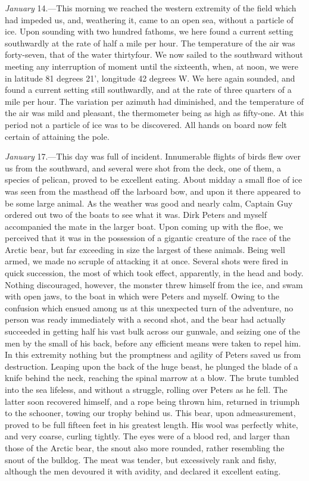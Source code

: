 \emph{January} 14.---This morning we reached the western extremity of the
field which had impeded us, and, weathering it, came to an open sea, without a
particle of ice. Upon sounding with two hundred fathoms, we here found a current
setting southwardly at the rate of half a mile per hour. The temperature of the
air was forty-seven, that of the water thirtyfour. We now sailed to the
southward without meeting any interruption of moment until the sixteenth, when,
at noon, we were in latitude 81 degrees 21', longitude 42 degrees W. We here
again sounded, and found a current setting still southwardly, and at the rate of
three quarters of a mile per hour. The variation per azimuth had diminished, and
the temperature of the air was mild and pleasant, the thermometer being as high
as fifty-one. At this period not a particle of ice was to be discovered. All
hands on board now felt certain of attaining the pole. 

\emph{January} 17.---This day was full of incident. Innumerable flights of
birds flew over us from the southward, and several were shot from the deck, one
of them, a species of pelican, proved to be excellent eating. About midday a
small floe of ice was seen from the masthead off the larboard bow, and upon it
there appeared to be some large animal. As the weather was good and nearly calm,
Captain Guy ordered out two of the boats to see what it was. Dirk Peters and
myself accompanied the mate in the larger boat. Upon coming up with the floe, we
perceived that it was in the possession of a gigantic creature of the race of
the Arctic bear, but far exceeding in size the largest of these animals. Being
well armed, we made no scruple of attacking it at once. Several shots were fired
in quick succession, the most of which took effect, apparently, in the head and
body. Nothing discouraged, however, the monster threw himself from the ice, and
swam with open jaws, to the boat in which were Peters and myself. Owing to the
confusion which ensued among us at this unexpected turn of the adventure, no
person was ready immediately with a second shot, and the bear had actually
succeeded in getting half his vast bulk across our gunwale, and seizing one of
the men by the small of his back, before any efficient means were taken to repel
him. In this extremity nothing but the promptness and agility of Peters saved us
from destruction. Leaping upon the back of the huge beast, he plunged the blade
of a knife behind the neck, reaching the spinal marrow at a blow. The brute
tumbled into the sea lifeless, and without a struggle, rolling over Peters as he
fell. The latter soon recovered himself, and a rope being thrown him, returned
in triumph to the schooner, towing our trophy behind us. This bear, upon
admeasurement, proved to be full fifteen feet in his greatest length. His wool
was perfectly white, and very coarse, curling tightly. The eyes were of a blood
red, and larger than those of the Arctic bear, the snout also more rounded,
rather resembling the snout of the bulldog. The meat was tender, but excessively
rank and fishy, although the men devoured it with avidity, and declared it
excellent eating. 

